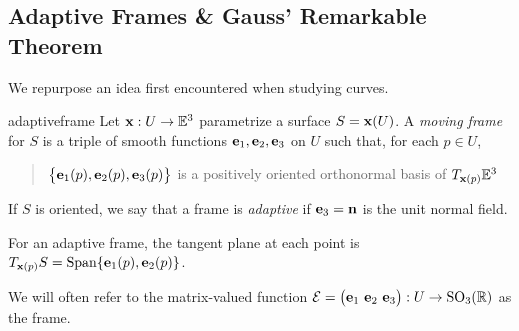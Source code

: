 \clearpage




\subsection{Adaptive Frames \& Gauss' Remarkable Theorem}

We repurpose an idea first encountered when studying curves. 

\begin{defn}{}{adaptiveframe}
Let ${\mathbf{x}}:U\to\mathbb{E}^3$ parametrize a surface $S={\mathbf{x}}(U)$. A \emph{moving frame} for $S$ is a triple of smooth functions ${\mathbf{e}}_1,{\mathbf{e}}_2,{\mathbf{e}}_3$ on $U$ such that, for each $p\in U$,
\begin{quote}
$\bigl\{{\mathbf{e}}_1(p),{\mathbf{e}}_2(p),{\mathbf{e}}_3(p)\bigr\}$ is a positively oriented orthonormal basis of $T_{{\mathbf{x}}(p)}\mathbb{E}^3$
\end{quote}
If $S$ is oriented, we say that a frame is \emph{adaptive} if ${\mathbf{e}}_3={\mathbf{n}}$ is the unit normal field.
\end{defn}

For an adaptive frame, the tangent plane at each point is $T_{{\mathbf{x}}(p)}S=\operatorname{Span}\{{\mathbf{e}}_1(p),{\mathbf{e}}_2(p)\}$.\par
We will often refer to the matrix-valued function $\cE=\bigl(\ve_1\ \ve_2\ \ve_3\bigr):U\to\rSO_3(\R)$ as the frame.

